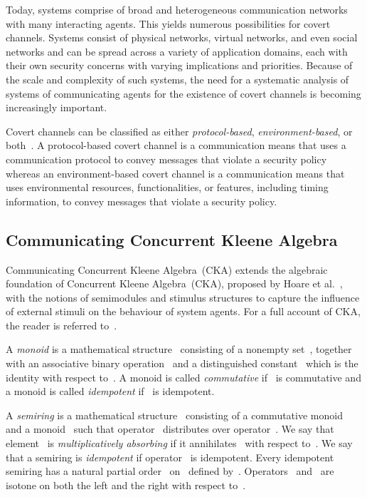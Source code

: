 \documentclass[copyright,creativecommons]{eptcs}
\makeatletter
\newcommand{\etal}{\textrm{et al.}\@\xspace}
\newcommand{\socas}{systems of communicating agents\@\xspace}
\newcommand{\CKAabbrv}{CKA\@\xspace}
\newcommand{\CCKA}{Communicating Concurrent Kleene Algebra\@\xspace}
\newcommand{\CCKAabbrv}{CKA\@\xspace}
\makeatother
\begin{document}
Today, systems comprise of broad and heterogeneous communication networks with many interacting agents. This yields numerous possibilities for covert channels. Systems consist of physical networks, virtual networks, and even social networks and can be spread across a variety of application domains, each with their own security concerns with varying implications and priorities. Because of the scale and complexity of such systems, the need for a systematic analysis of \socas for the existence of covert channels is becoming increasingly important. 

Covert channels can be classified as either \emph{protocol-based}, \emph{environment-based}, or both~\cite{Jaskolka2010aa}. A protocol-based covert channel is a communication means that uses a communication protocol to convey messages that violate a security policy whereas an environment-based covert channel is a communication means that uses environmental resources, functionalities, or features, including timing information, to convey messages that violate a security policy.




\subsection{\CCKA}
\label{sub:c2ka}


\CCKA~(\CCKAabbrv) extends the algebraic foundation of Concurrent Kleene Algebra~(\CKAabbrv), proposed by Hoare \etal~\cite{Hoare2009aa,Hoare2009ab,Hoare2010aa,Hoare2011aa}, with the notions of semimodules and stimulus structures to capture the influence of external stimuli on the behaviour of system agents. For a full account of \CCKAabbrv, the reader is referred to~\cite{Jaskolka2013aa,Jaskolka2014aa}. 

A \emph{monoid} is a mathematical structure~ consisting of a nonempty set~, together with an associative binary operation~ and a distinguished constant~ which is the identity with respect to~. A monoid is called \emph{commutative} if~ is commutative and a monoid is called \emph{idempotent} if~ is idempotent.

A \emph{semiring} is a mathematical structure~ consisting of a commutative monoid~  and a monoid~ such that operator~ distributes over operator~. We say that element~ is \emph{multiplicatively absorbing} if it annihilates~ with respect to~. We say that a semiring is \emph{idempotent} if operator~ is idempotent. Every idempotent semiring has a natural partial order~ on~ defined by~. Operators~ and~ are isotone on both the left and the right with respect to~.
\end{document}

